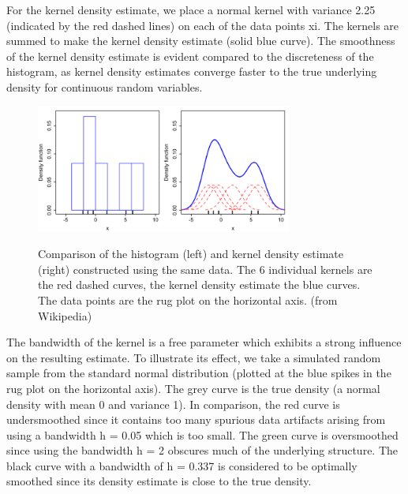 For the kernel density estimate, we place a normal kernel with variance 2.25 (indicated by the red dashed lines) on each of the data points xi. The kernels are summed to make the kernel density estimate (solid blue curve). The smoothness of the kernel density estimate is evident compared to the discreteness of the histogram, as kernel density estimates converge faster to the true underlying density for continuous random variables.

\begin{figure}[ht]
  \centering
  \includegraphics[width=0.75\textwidth]{../Images/Comparison_of_1D_histogram_and_KDE.png}\\
  \caption{Comparison of the histogram (left) and kernel density estimate (right) constructed using the same data. The 6 individual kernels are the red dashed curves, the kernel density estimate the blue curves. The data points are the rug plot on the horizontal axis. (from Wikipedia)}
\end{figure}

The bandwidth of the kernel is a free parameter which exhibits a strong influence on the resulting estimate. To illustrate its effect, we take a simulated random sample from the standard normal distribution (plotted at the blue spikes in the rug plot on the horizontal axis). The grey curve is the true density (a normal density with mean 0 and variance 1). In comparison, the red curve is undersmoothed since it contains too many spurious data artifacts arising from using a bandwidth h = 0.05 which is too small. The green curve is oversmoothed since using the bandwidth h = 2 obscures much of the underlying structure. The black curve with a bandwidth of h = 0.337 is considered to be optimally smoothed since its density estimate is close to the true density.

